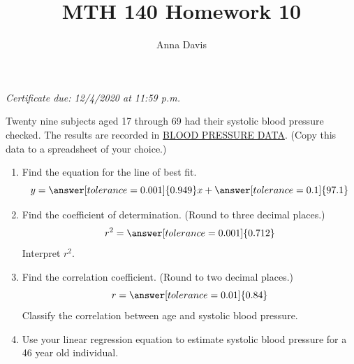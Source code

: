 \documentclass{ximera}
\author{Anna Davis} \title{MTH 140 Homework 10}
\begin{document}
\begin{abstract}

\end{abstract}
\maketitle
 \textit{Certificate due: 12/4/2020 at 11:59 p.m.}
\begin{problem}\label{prob:140hom10prob1}

Twenty nine subjects aged 17 through 69 had their systolic blood pressure checked.  The results are recorded in \href{https://docs.google.com/spreadsheets/d/1v_i5UPj_IH2-d8QphkCZJiPbK0oV1fd0NAXmLnT8hnE/edit?usp=sharing}{BLOOD PRESSURE DATA}.  (Copy this data to a spreadsheet of your choice.)
\begin{enumerate}
    \item Find the equation for the line of best fit.
    $$y=\answer[tolerance=0.001]{0.949}x+\answer[tolerance=0.1]{97.1}$$
    \item Find the coefficient of determination. (Round to three decimal places.)
    $$r^2=\answer[tolerance=0.001]{0.712}$$
    Interpret $r^2$.
    \begin{multipleChoice} 
\end{multipleChoice} 
    \item Find the correlation coefficient.  (Round to two decimal places.)
    $$r=\answer[tolerance=0.01]{0.84}$$
    Classify the correlation between age and systolic blood pressure.
    
    \begin{multipleChoice} 
\end{multipleChoice}  
\item Use your linear regression equation to estimate systolic blood pressure for a 46 year old individual.  


\end{enumerate}
\end{problem}
\end{document}
